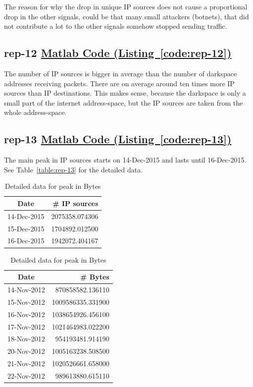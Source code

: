 \documentclass{article}
\newcommand{\codelink}[1]{%
    \hyperref[#1]{\quad\faArrowCircleRight\enskip Matlab Code (Listing~\ref{#1})}%
}
\begin{document}
The reason for why the drop in unique IP sources does not cause a proportional drop in the other
signals, could be that many small attackers (botnets), that did not contribute a lot to the other
signals somehow stopped sending traffic.

\subsection{rep-12 \codelink{code:rep-12}}

The number of IP sources is bigger in average than the number of darkspace addresses
receiving packets. There are on average around ten times more IP sources than IP destinations.
This makes sense, because the darkspace is only a small part of the internet address-space, but
the IP sources are taken from the whole address-space.

\subsection{rep-13 \codelink{code:rep-13}}

The main peak in IP sources starts on 14-Dec-2015 and lasts until 16-Dec-2015. See Table~\ref{table:rep-13}
for the detailed data.

\begin{table}[H]
    \parbox{.5\linewidth}{
        \centering
        \begin{tabular}{c|r}
            Date & \# IP sources \\
            \hline
            14-Dec-2015 & 2075358.074306 \\
            15-Dec-2015 & 1704892.012500 \\
            16-Dec-2015 & 1942072.404167 \\
        \end{tabular}
        \caption{\label{table:rep-13} Detailed data for peak in IP sources}
    }
    \parbox{.5\linewidth}{
        \centering
        \begin{tabular}{c|r}
            Date & \# Bytes \\
            \hline
            14-Nov-2012& 870858582.136110 \\ 
            15-Nov-2012& 1009586335.331900 \\
            16-Nov-2012& 1038654926.456100 \\
            17-Nov-2012& 1021464983.022200 \\
            18-Nov-2012& 954193481.914190 \\ 
            20-Nov-2012& 1005163238.508500 \\
            21-Nov-2012& 1020526661.658000 \\
            22-Nov-2012& 989613880.615110  \\
        \end{tabular}
        \caption{\label{table:rep-13-optional} Detailed data for peak in Bytes}
    }
\end{table}
\end{document}

